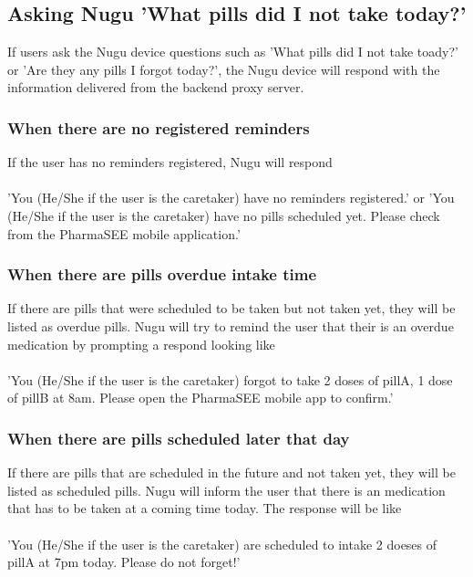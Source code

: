 \documentclass[conference]{IEEEtran}
\begin{document}
\subsection{Asking Nugu 'What pills did I not take today?'}
If users ask the Nugu device questions such as 'What pills did I not take toady?' or 'Are they any pills I forgot today?', the Nugu device will respond with the information delivered from the backend proxy server. \\

\subsubsection{When there are no registered reminders}
If the user has no reminders registered, Nugu will respond  \\ \\
'You (He/She if the user is the caretaker) have no reminders registered.' or 'You (He/She if the user is the caretaker) have no pills scheduled yet. Please check from the PharmaSEE mobile application.'\\

\subsubsection{When there are pills overdue intake time}
If there are pills that were scheduled to be taken but not taken yet, they will be listed as overdue pills. Nugu will try to remind the user that their is an overdue medication by prompting a respond looking like \\ \\ 
'You (He/She if the user is the caretaker) forgot to take 2 doses of pillA, 1 dose of pillB at 8am. Please open the PharmaSEE mobile app to confirm.'\\

\subsubsection{When there are pills scheduled later that day}
If there are pills that are scheduled in the future and not taken yet, they will be listed as scheduled pills. Nugu will inform the user that there is an medication that has to be taken at a coming time today. The response will be like \\ \\ 
'You (He/She if the user is the caretaker) are scheduled to intake 2 doeses of pillA at 7pm today. Please do not forget!'\\
\end{document}
